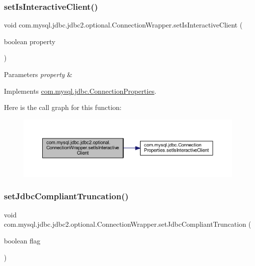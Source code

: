 \subsubsection{\texorpdfstring{set\+Is\+Interactive\+Client()}{setIsInteractiveClient()}}
{\footnotesize\ttfamily void com.\+mysql.\+jdbc.\+jdbc2.\+optional.\+Connection\+Wrapper.\+set\+Is\+Interactive\+Client (\begin{DoxyParamCaption}\item[{boolean}]{property }\end{DoxyParamCaption})}


\begin{DoxyParams}{Parameters}
{\em property} & \\
\hline
\end{DoxyParams}


Implements \mbox{\hyperlink{interfacecom_1_1mysql_1_1jdbc_1_1_connection_properties_a8157f1dda8d47aca668811bb7c932ec0}{com.\+mysql.\+jdbc.\+Connection\+Properties}}.

Here is the call graph for this function\+:
\nopagebreak
\begin{figure}[H]
\begin{center}
\leavevmode
\includegraphics[width=350pt]{classcom_1_1mysql_1_1jdbc_1_1jdbc2_1_1optional_1_1_connection_wrapper_a62fdb1de695db692ac572889bc2299c8_cgraph}
\end{center}
\end{figure}
\mbox{\label{classcom_1_1mysql_1_1jdbc_1_1jdbc2_1_1optional_1_1_connection_wrapper_ac6acbc9e9f58e73211256f68e7f36a9a}} 
\subsubsection{\texorpdfstring{set\+Jdbc\+Compliant\+Truncation()}{setJdbcCompliantTruncation()}}
{\footnotesize\ttfamily void com.\+mysql.\+jdbc.\+jdbc2.\+optional.\+Connection\+Wrapper.\+set\+Jdbc\+Compliant\+Truncation (\begin{DoxyParamCaption}\item[{boolean}]{flag }\end{DoxyParamCaption})}



